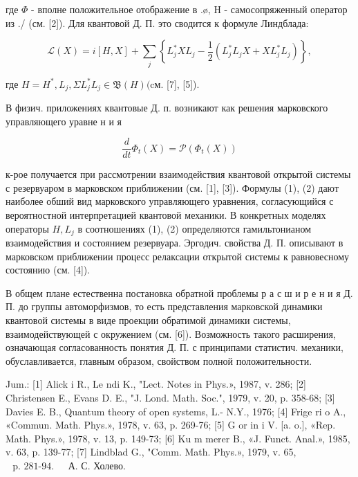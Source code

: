 \documentclass[10pt]{article}
\begin{document}
где $\Phi$ - вполне положительное отображение в .ø, $\mathrm{H}$ - самосопряженный оператор из ./ (см. [2]). Для квантовой Д. П. это сводится к формуле Линдблада:



\[

\mathscr{L}(X)=i[H, X]+\sum_{j}\left\{L_{j}^{*} X L_{j}-\frac{1}{2}\left(L_{j}^{*} L_{j} X+X L_{j}^{*} L_{j}\right)\right\},

\]



где $H=H^{*}, L_{j}, \Sigma L_{j}^{*} L_{j} \in \mathfrak{B}(H)(\mathrm{cм}$. [7], [5]).



В физич. приложениях квантовые Д. п. возникают как решения марковского управляющего уравне н и я



\[

\frac{d}{d t} \Phi_{t}(X)=\mathscr{P}\left(\Phi_{t}(X)\right)

\]



к-рое получается при рассмотрении взаимодействия квантовой открытой системы с резервуаром в марковском приближении (см. [1], [3]). Формулы (1), (2) дают наиболее обший вид марковского управляющего уравнения, согласующийся с вероятностной интерпретацией квантовой механики. В конкретных моделях операторы $H, L_{j}$ в соотношениях (1), (2) определяются гамильтонианом взаимодействия и состоянием резервуара. Эргодич. свойства Д. П. описывают в марковском приближении процесс релаксации открытой системы к равновесному состоянию (см. [4]).



В общем плане естественна постановка обратной проблемы р а с ш и р е н и я Д. П. до группы автоморфизмов, то есть представления марковской динамики квантовой системы в виде проекции обратимой динамики системы, взаимодействующей с окружением (см. [6]). Возможность такого расширения, означающая согласованность понятия Д. П. с принципами статистич. механики, обуславливается, главным образом, свойством полной положительности.



Jum.: [1] Alick i R., Le ndi K., "Lect. Notes in Phys.», 1987, v. 286; [2] Christensen E., Evans D. E., "J. Lond. Math. Soc.", 1979, v. 20, p. 358-68; [3] Davies E. B., Quantum theory of open systems, L.- N.Y., 1976; [4] Frige ri o A., «Commun. Math. Phys.», 1978, v. 63, p. 269-76; [5] G or in i V. [a. o.], «Rep. Math. Phys.», 1978, v. 13, p. 149-73; [6] Ku m merer B., «J. Funct. Anal.», 1985, v. 63, p. 139-77; [7] Lindblad G., "Comm. Math. Phys.», 1979, v. 65, $\begin{array}{ll}\text { p. 281-94. } & \text { А. С. Холево. }\end{array}$
\end{document}

